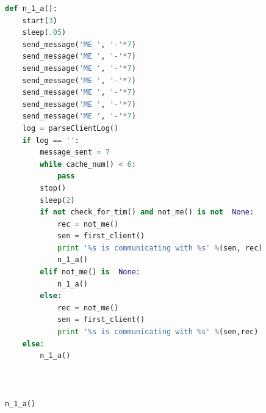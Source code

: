 \documentclass[preprint,12pt,3p]{elsarticle}
\begin{document}
\begin{lstlisting}[language=Python]
def n_1_a():
    start(3)
    sleep(.05)
    send_message('ME ', '-'*7)
    send_message('ME ', '-'*7)
    send_message('ME ', '-'*7)
    send_message('ME ', '-'*7)
    send_message('ME ', '-'*7)
    send_message('ME ', '-'*7)
    send_message('ME ', '-'*7)
    log = parseClientLog()
    if log == '':
        message_sent = 7
        while cache_num() < 6:
            pass
        stop()
        sleep(2)
        if not check_for_tim() and not_me() is not  None:
            rec = not_me()
            sen = first_client()
            print '%s is communicating with %s' %(sen, rec)
            n_1_a()
        elif not_me() is  None:
            n_1_a()
        else:
            rec = not_me()
            sen = first_client()
            print '%s is communicating with %s' %(sen,rec)
    else:
        n_1_a()



n_1_a()

\end{lstlisting}


\label{appendix-sec1}

% 
% 
\end{document}
